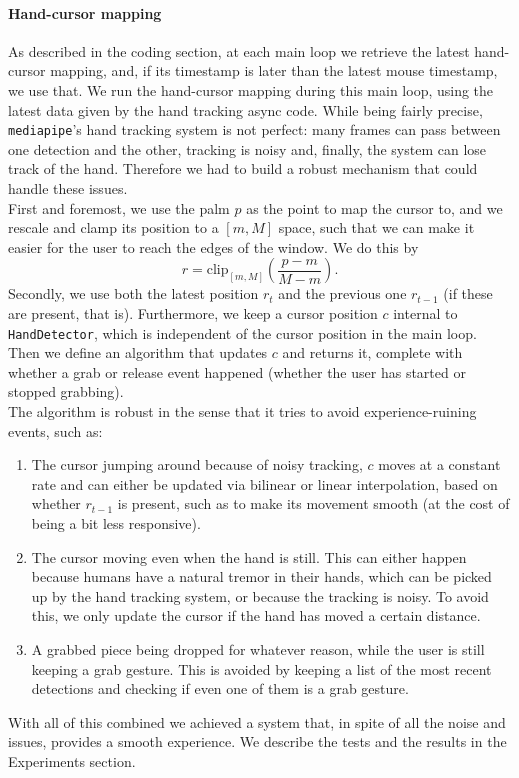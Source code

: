 \documentclass[a4paper, 11pt, twocolumn]{IEEEtran}
\begin{document}
    \paragraph*{Hand-cursor mapping} As described in the coding section, at each main loop we retrieve the latest hand-cursor mapping, and, if its timestamp is later than the latest mouse timestamp, we use that. We run the hand-cursor mapping during this main loop, using the latest data given by the hand tracking async code.
    While being fairly precise, \texttt{mediapipe}'s hand tracking system is not perfect: many frames can pass between one detection and the other, tracking is noisy and, finally, the system can lose track of the hand. Therefore we had to build a robust mechanism that could handle these issues.\\
    First and foremost, we use the palm $p$ as the point to map the cursor to, and we rescale and clamp its position to a $[m, M]$ space, such that we can make it easier for the user to reach the edges of the window.
    We do this by
    \begin{equation}
        r = \mathrm{clip}_{[m,M]}(\frac{p - m}{M - m}).
    \end{equation}
    Secondly, we use both the latest position $r_t$ and the previous one $r_{t-1}$ (if these are present, that is). Furthermore, we keep a cursor position $c$ internal to \texttt{HandDetector}, which is independent of the cursor position in the main loop. Then we define an algorithm that updates $c$ and returns it, complete with whether a grab or release event happened (whether the user has started or stopped grabbing).\\
    The algorithm is robust in the sense that it tries to avoid experience-ruining events, such as:
    \begin{enumerate}
        \item The cursor jumping around because of noisy tracking, $c$ moves at a constant rate and can either be updated via bilinear or linear interpolation, based on whether $r_{t-1}$ is present, such as to make its movement smooth (at the cost of being a bit less responsive).
        \item The cursor moving even when the hand is still. This can either happen because humans have a natural tremor in their hands, which can be picked up by the hand tracking system, or because the tracking is noisy. To avoid this, we only update the cursor if the hand has moved a certain distance.
        \item A grabbed piece being dropped for whatever reason, while the user is still keeping a grab gesture. This is avoided by keeping a list of the most recent detections and checking if even one of them is a grab gesture.
    \end{enumerate}
    With all of this combined we achieved a system that, in spite of all the noise and issues, provides a smooth experience. We describe the tests and the results in the Experiments section.
\end{document}
